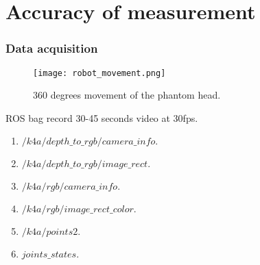 \section{Accuracy of measurement}
\begin{frame}
	\frametitle{Data acquisition}
	\begin{figure}[hbt!]
		\centering
		\texttt{[image: robot\_movement.png]}
		\caption{360 degrees movement of the phantom head.} 
		\label{fig:robot_movement}
	\end{figure}
	ROS bag record 30-45 seconds video at 30fps.
	\begin{enumerate}
		\item $/k4a/depth\_to\_rgb/camera\_info.$
		\item $/k4a/depth\_to\_rgb/image\_rect.$
		\item $/k4a/rgb/camera\_info.$
		\item $/k4a/rgb/image\_rect\_color.$
		\item $/k4a/points2.$
		\item $joints\_states.$
	\end{enumerate}
		
\end{frame}



